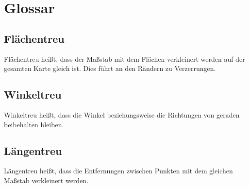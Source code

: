 \section*{Glossar}
\subsection*{Flächentreu}
Flächentreu heißt, dass der Maßstab mit dem Flächen verkleinert werden auf der gesamten Karte gleich ist. Dies führt an den Rändern zu Verzerrungen.
\subsection*{Winkeltreu}
Winkeltreu heißt, dass die Winkel beziehungsweise die Richtungen von geraden beibehalten bleiben.
\subsection*{Längentreu}
Längentreu heißt, dass die Entfernungen zwischen Punkten mit dem gleichen Maßstab verkleinert werden.